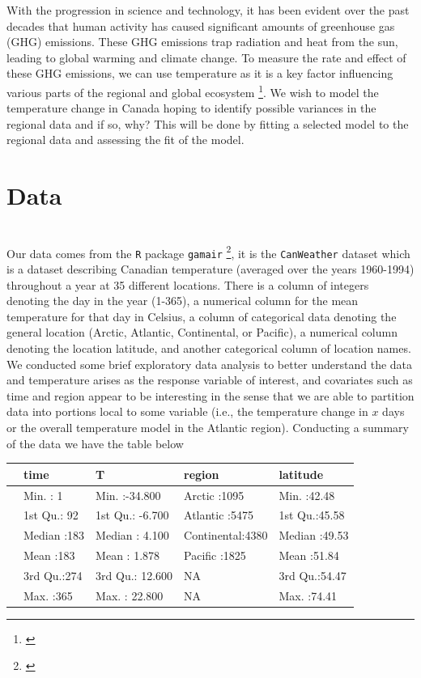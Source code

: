 \documentclass[aoas]{imsart}\usepackage[]{graphicx}\usepackage[]{xcolor}
\newenvironment{knitrout}{}{} %
\begin{document}
With the progression in science and technology, it has been evident over the past decades that human activity has caused significant amounts of greenhouse gas (GHG) emissions. These GHG emissions trap radiation and heat from the sun, leading to global warming and climate change. To measure the rate and effect of these GHG emissions, we can use temperature as it is a key factor influencing various parts of the regional and global ecosystem \footnote{\cite{b1}}. We wish to model the temperature change in Canada hoping to identify possible variances in the regional data and if so, why? This will be done by fitting a selected model to the regional data and assessing the fit of the model.

\section{Data}\hfill\\

Our data comes from the \texttt{R} package \texttt{gamair} \footnote{\cite{b2}}, it is the \texttt{CanWeather} dataset which is a dataset describing Canadian temperature (averaged over the years 1960-1994) throughout a year at 35 different locations. There is a column of integers denoting the day in the year (1-365), a numerical column for the mean temperature for that day in Celsius, a column of categorical data denoting the general location (Arctic, Atlantic, Continental, or Pacific), a numerical column denoting the location latitude, and another categorical column of location names. We conducted some brief exploratory data analysis to better understand the data and temperature arises as the response variable of interest, and covariates such as time and region appear to be interesting in the sense that we are able to partition data into portions local to some variable (i.e., the temperature change in $x$ days or the overall temperature model in the Atlantic region). Conducting a summary of the data we have the table below
\begin{knitrout}
\color{fgcolor}\begin{table}[!h]
\centering\begingroup\fontsize{10}{12}\selectfont

\begin{tabular}[t]{lllll}
\toprule
  &      time &       T &         region &    latitude\\
\midrule
 & Min.   :  1 & Min.   :-34.800 & Arctic     :1095 & Min.   :42.48\\
 & 1st Qu.: 92 & 1st Qu.: -6.700 & Atlantic   :5475 & 1st Qu.:45.58\\
 & Median :183 & Median :  4.100 & Continental:4380 & Median :49.53\\
 & Mean   :183 & Mean   :  1.878 & Pacific    :1825 & Mean   :51.84\\
 & 3rd Qu.:274 & 3rd Qu.: 12.600 & NA & 3rd Qu.:54.47\\
 & Max.   :365 & Max.   : 22.800 & NA & Max.   :74.41\\
\bottomrule
\end{tabular}
\endgroup{}
\end{table}

\end{knitrout}
\newpage
\end{document}
